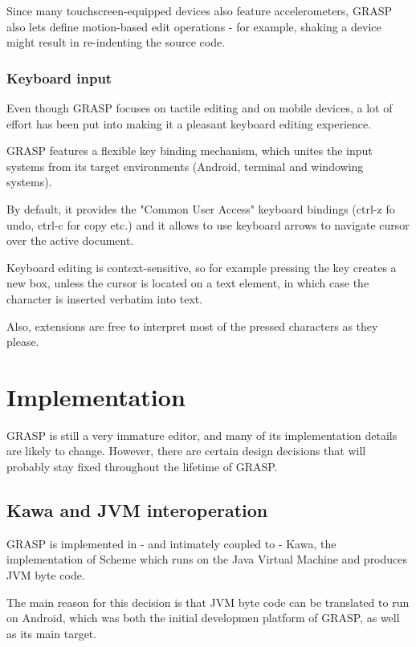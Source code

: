 \documentclass[11pt]{article}
\begin{document}
Since many touchscreen-equipped devices also
feature accelerometers, GRASP also lets define
motion-based edit operations - for example, shaking
a device might result in re-indenting the source
code.

\subsubsection{Keyboard input}
\label{sec:orgdb957e9}

Even though GRASP focuses on tactile editing
and on mobile devices, a lot of effort has been
put into making it a pleasant keyboard editing
experience.

GRASP features a flexible key binding mechanism,
which unites the input systems from its target
environments (Android, terminal and windowing
systems).

By default, it provides the "Common User Access"
keyboard bindings (ctrl-z fo undo, ctrl-c for copy
etc.) and it allows to use keyboard arrows to
navigate cursor over the active document.

Keyboard editing is context-sensitive, so
for example pressing the key creates a new box,
unless the cursor is located on a text element,
in which case the character is inserted verbatim
into text.

Also, extensions are free to interpret
most of the pressed characters as they please.

\section{Implementation}
\label{sec:org86f5b1f}

GRASP is still a very immature editor, and many 
of its implementation details are likely to change. 
However, there are certain design decisions that
will probably stay fixed throughout the lifetime
of GRASP.

\subsection{Kawa and JVM interoperation}
\label{sec:org9c8e582}

GRASP is implemented in - and intimately coupled
to - Kawa, the implementation of Scheme which runs
on the Java Virtual Machine and produces JVM byte code.

The main reason for this decision is that JVM
byte code can be translated to run on Android,
which was both the initial developmen platform
of GRASP, as well as its main target.
\end{document}
